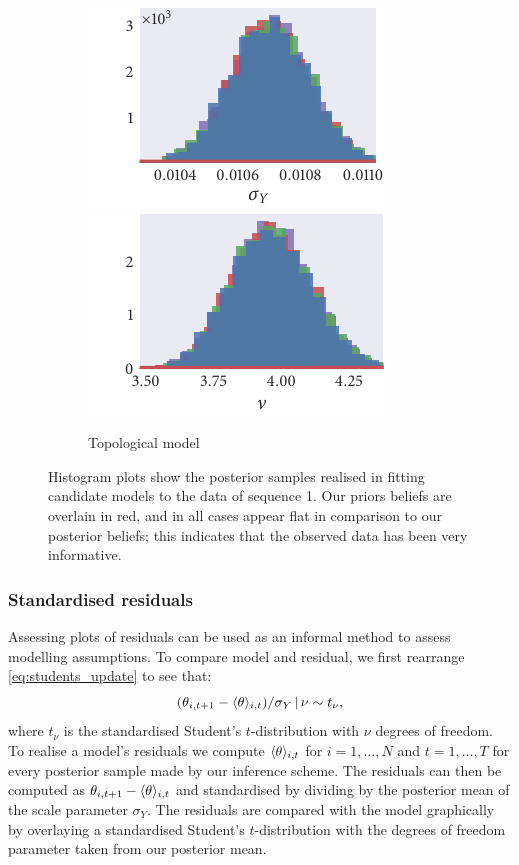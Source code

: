 \begin{figure}[p]
\begin{subfigure}[b]{\textwidth}
    \includegraphics{seq1/top_hist_sigma_Y.pdf}%
    \includegraphics{seq1/top_hist_nu.pdf}%
    \caption{Topological model}
    \label{subfig:posterior_seq1_top}
  \end{subfigure}
  \vspace{-1.5em}
  \caption{Histogram plots show the posterior samples realised in fitting
    candidate models to the data of sequence 1. Our priors beliefs are overlain
    in red, and in all cases appear flat in comparison to our posterior
    beliefs; this indicates that the observed data has been very informative.}
  \label{fig:posteriors_seq1}
\end{figure}

\subsubsection{Standardised residuals}

Assessing plots of residuals can be used as an informal method to assess
modelling assumptions. To compare model and residual, we first rearrange
\cref{eq:students_update} to see that:
\begin{equation}
  \label{eq:residuals}
  (\theta_{i,t+1} - \langle\theta\rangle_{i,t}) / \sigma_Y \,|\, \nu \sim t_{\nu},
\end{equation}
where $t_{\nu}$ is the standardised Student's $t$-distribution with $\nu$
degrees of freedom. To realise a model's residuals we compute
$\langle\theta\rangle_{i,t}$ for $i=1,\ldots,N$ and $t=1,\ldots,T$ for every
posterior sample made by our inference scheme. The residuals can then be
computed as $\theta_{i,t+1} - \langle\theta\rangle_{i,t}$ and standardised by
dividing by the posterior mean of the scale parameter $\sigma_Y$. The residuals
are compared with the model graphically by overlaying a standardised Student's
$t$-distribution with the degrees of freedom parameter taken from our posterior
mean.

